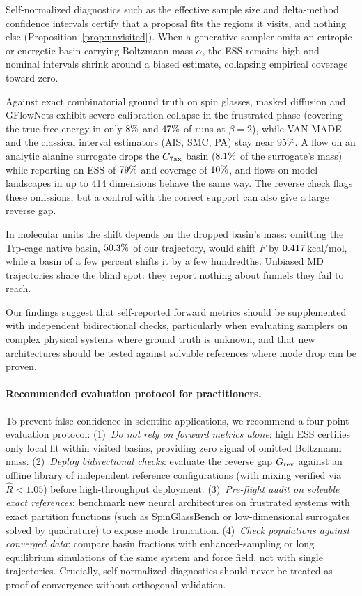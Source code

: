 Self-normalized diagnostics such as the effective sample size and delta-method confidence intervals certify that a proposal fits the regions it visits, and nothing else (Proposition~\ref{prop:unvisited}). When a generative sampler omits an entropic or energetic basin carrying Boltzmann mass $\alpha$, the ESS remains high and nominal intervals shrink around a biased estimate, collapsing empirical coverage toward zero.

Against exact combinatorial ground truth on spin glasses, masked diffusion and GFlowNets exhibit severe calibration collapse in the frustrated phase (covering the true free energy in only $8\%$ and $47\%$ of runs at $\beta=2$), while VAN-MADE and the classical interval estimators (AIS, SMC, PA) stay near 95\%. A flow on an analytic alanine surrogate drops the $C_{7\rm ax}$ basin ($8.1\%$ of the surrogate's mass) while reporting an ESS of $79\%$ and coverage of $10\%$, and flows on model landscapes in up to 414 dimensions behave the same way. The reverse check flags these omissions, but a control with the correct support can also give a large reverse gap.

In molecular units the shift depends on the dropped basin's mass: omitting the Trp-cage native basin, $50.3\%$ of our trajectory, would shift $F$ by $0.417$\,kcal/mol, while a basin of a few percent shifts it by a few hundredths. Unbiased MD trajectories share the blind spot: they report nothing about funnels they fail to reach.

Our findings suggest that self-reported forward metrics should be supplemented with independent bidirectional checks, particularly when evaluating samplers on complex physical systems where ground truth is unknown, and that new architectures should be tested against solvable references where mode drop can be proven.

\paragraph{Recommended evaluation protocol for practitioners.}
To prevent false confidence in scientific applications, we recommend a four-point evaluation protocol:
(1)~\emph{Do not rely on forward metrics alone}: high ESS certifies only local fit within visited basins, providing zero signal of omitted Boltzmann mass.
(2)~\emph{Deploy bidirectional checks}: evaluate the reverse gap $G_{\rm rev}$ against an offline library of independent reference configurations (with mixing verified via $\hat{R} < 1.05$) before high-throughput deployment.
(3)~\emph{Pre-flight audit on solvable exact references}: benchmark new neural architectures on frustrated systems with exact partition functions (such as SpinGlassBench or low-dimensional surrogates solved by quadrature) to expose mode truncation.
(4)~\emph{Check populations against converged data}: compare basin fractions with enhanced-sampling or long equilibrium simulations of the same system and force field, not with single trajectories.
Crucially, self-normalized diagnostics should never be treated as proof of convergence without orthogonal validation.